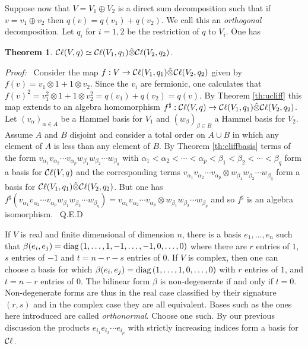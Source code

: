\documentclass[12pt,titlepage]{article}
\def\cC{{\cal C}}
\def\Cl{{\cC\ell}}
\def\diag{\hbox{diag}\,}
\newtheorem{theorem}{Theorem}
\newenvironment{proof}{{\em Proof:\/}\ }{\ Q.E.D}
\begin{document}
Suppose now that \(V=V_1\oplus V_2\) is a direct sum decomposition such
that if \(v=v_1\oplus v_2\) then \(q(v)=q(v_1)+q(v_2)\). We call this an
%
{\em orthogonal\/} decomposition. Let \(q_i\) for \(i=1,2\)
be the restriction of \(q\) to \(V_i\). One has
\begin{theorem}\label{th:twipcl}%
 \(\Cl(V,q)\simeq
\Cl(V_1,q_1)\hat\otimes\Cl(V_2,q_2)\).
\end{theorem}%
\begin{proof} Consider the map \(f:V \to
\Cl(V_1,q_1)\hat\otimes\Cl(V_2,q_2)\) given by
\(f(v) = v_1\otimes 1+1\otimes v_2\). Since the \(v_i\) are
fermionic, one calculates that \(f(v)^2=v_1^2\otimes 1+1\otimes
v_2^2=q(v_1)+q(v_2)=q(v)\). By Theorem \ref{th:ucliff} this map extends
to an algebra homomorphism
\(f^\sharp:\Cl(V,q)\to \Cl(V_1,q_1)\hat\otimes\Cl(V_2,q_2)\). Let 
\((v_\alpha)_{\alpha\in A}\) be a Hammel basis for \(V_1\) and 
\((w_\beta)_{\beta\in B}\) a Hammel basis for \(V_2\). 
Assume \(A\) and \(B\) 
disjoint and consider a total order on \(A\cup B\) in which any element of 
\(A\) is less than any element of \(B\). By Theorem \ref{th:cliffbasis} 
terms of the form 
\(v_{\alpha_1}v_{\alpha_2}\cdots v_{\alpha_p}
w_{\beta_1}w_{\beta_2}\cdots w_{\beta_q}\) with 
\(\alpha_1<\alpha_2<\cdots<\alpha_p<\beta_1<\beta_2<\cdots<\beta_q\) form a 
basis for \(\Cl(V,q)\) and the corresponding terms 
\(v_{\alpha_1}v_{\alpha_2}\cdots v_{\alpha_p}\otimes
w_{\beta_1}w_{\beta_2}\cdots w_{\beta_q}\) form a basis for 
\(\Cl(V_1,q_1)\hat\otimes\Cl(V_2,q_2)\). But one has 
\(f^\sharp(v_{\alpha_1}v_{\alpha_2}\cdots v_{\alpha_p}
w_{\beta_1}w_{\beta_2}\cdots w_{\beta_q})=v_{\alpha_1}v_{\alpha_2}\cdots 
v_{\alpha_p}\otimes
w_{\beta_1}w_{\beta_2}\cdots w_{\beta_q}\) and so \(f^\sharp \) is an algebra 
isomorphism. 
\end{proof}%

If \(V\) is real and finite dimensional of dimension \(n\), 
there is a basis
\(e_1,\dots,e_n\) such that \(\beta(e_i,e_j)=\diag(1,\dots,1,-1,\dots,-
1,0,\dots,0)\) where there are \(r\) entries of \(1\), \(s\) entries of
\(-1\) and \(t=n-r-s\) entries of \(0\).  If \(V\) is complex, then
one can choose a basis for which \(\beta(e_i,e_j)=
\diag(1,\dots,1,0,\dots,0)\) with \(r\) entries of \(1\),
and \(t=n-r\) entries of \(0\). The bilinear form \(\beta\) is
non-degenerate if and only if \(t=0\). Non-degenerate forms are thus in
the real case classified by their signature \((r,s)\) and in the complex
case they are all equivalent.
Bases such as the ones here introduced are called {\em orthonormal\/}.
%
 Choose one such. By our 
previous discussion the products
\(e_{i_1}e_{i_2}\cdots e_{i_p}\) with strictly increasing indices
form a basis for \(\Cl\).
\end{document}

